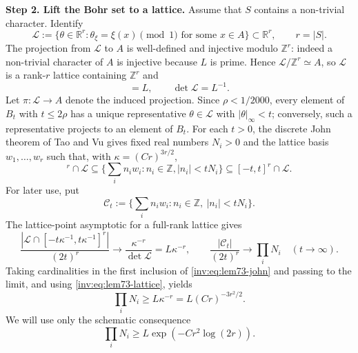 \documentclass[twoside]{aomart}
\makeatletter
\theoremstyle{paperplain}
\theoremstyle{paperdefinition}
\renewenvironment{proof}[1][\proofname]{\par\pushQED{\qed}%
  \normalfont\topsep6\p@\@plus3\p@\relax\trivlist
  \item[\hskip\labelsep\itshape #1\@addpunct{.}]\ignorespaces
}{\popQED\endtrivlist\@endpefalse}
\newcommand{\Z}{\mathbb Z}
\numberwithin{equation}{section}
\makeatother
\begin{document}
\begin{proof}
\par
\medskip
\noindent\textbf{Step 2. Lift the Bohr set to a lattice.}
Assume that $S$ contains a non-trivial character.  Identify
\[
 \mathcal L:=\{\theta\in\mathbb R^r:\theta_\xi=\xi(x)\pmod 1
       \text{ for some }x\in A\}\subset\mathbb R^r,
 \qquad r=|S|.
\]
The projection from $\mathcal L$ to $A$ is well-defined and injective modulo
$\mathbb Z^r$: indeed a non-trivial character of $A$ is injective because
$L$ is prime.  Hence $\mathcal L/\mathbb Z^r\simeq A$, so $\mathcal L$ is a
rank-$r$ lattice containing $\mathbb Z^r$ and
\begin{equation}
 [\mathcal L:\mathbb Z^r]=L,\qquad \det\mathcal L=L^{-1}.                                      \label{inv:eq:lem73-lattice}
\end{equation}
Let $\pi:\mathcal L\to A$ denote the induced projection. Since
$\rho<1/2000$, every element of $B_t$ with $t\le2\rho$ has a unique
representative $\theta\in\mathcal L$ with $|\theta|_\infty<t$; conversely,
such a representative projects to an element of $B_t$.
For each $t>0$, the discrete John theorem of Tao and Vu \cite[Theorem 1.6]{TaoVuJohn} gives fixed real numbers $N_i>0$ and the lattice basis 
$w_1,\ldots,w_r$ such that,
with $\kappa=(Cr)^{3r/2}$,
\begin{equation}
 [-t\kappa^{-1},t\kappa^{-1}]^r\cap\mathcal L
 \subseteq\Big\{\sum_i n_iw_i:n_i\in \Z,|n_i|<tN_i\Big\}
 \subseteq[-t,t]^r\cap\mathcal L .                                  \label{inv:eq:lem73-john}
\end{equation}
For later use, put
\[
 \mathcal C_t:=\Big\{\sum_{i} n_iw_i:
                    n_i\in\mathbb Z,\ |n_i|<tN_i\Big\}.
\]
The lattice-point asymptotic for a full-rank lattice gives
\[
 \frac{|\mathcal L\cap[-t\kappa^{-1},t\kappa^{-1}]^r|}{(2t)^r}
 \longrightarrow \frac{\kappa^{-r}}{\det\mathcal L}
 =L\kappa^{-r},
 \qquad
 \frac{|\mathcal C_t|}{(2t)^r}\longrightarrow\prod_iN_i
 \quad (t\to\infty).
\]
Taking cardinalities in the first inclusion of \eqref{inv:eq:lem73-john}
and passing to the limit, and using \eqref{inv:eq:lem73-lattice}, yields
\begin{equation}
 \prod_iN_i\ge L\kappa^{-r}=L(Cr)^{-3r^2/2}.                       \label{inv:eq:lem73-volume}
\end{equation}
We will use only the schematic consequence
$$\prod_iN_i\ge L\exp(-Cr^2\log(2r)).$$ 


\end{proof}
\end{document}
